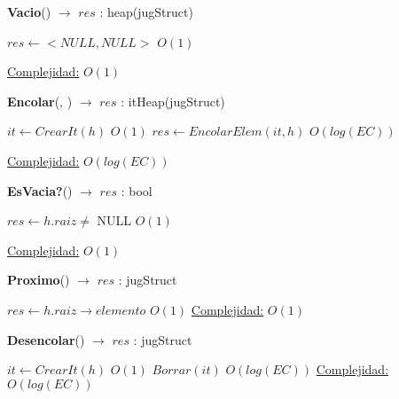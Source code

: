 \begin{Algoritmos}
   
\begin{algorithm}[H]{\textbf{Vacio}() $\to$ $res$ : heap(jugStruct)}
    	\begin{algorithmic}[1]
			 \State $res \gets  <NULL, NULL> $ \Comment $O(1)$

			\medskip
			\Statex \underline{Complejidad:} $O(1)$
    	\end{algorithmic}
\end{algorithm}
   
\begin{algorithm}[H]{\textbf{Encolar}(, ) $\to$ $res$ : itHeap(jugStruct)}
    	\begin{algorithmic}[1]
			 \State $it \gets  CrearIt(h) $ \Comment $O(1)$
			 \State $res \gets EncolarElem(it, h) $ \Comment $O(log(EC))$
			 

			\medskip
			\Statex \underline{Complejidad:} $O(log(EC))$
    	\end{algorithmic}
\end{algorithm}


\begin{algorithm}[H]{\textbf{EsVacia?}() $\to$ $res$ : bool}
    	\begin{algorithmic}[1]
			 \State $res \gets  h.raiz \not=$ NULL \Comment $O(1)$

			\medskip
			\Statex \underline{Complejidad:} $O(1)$
    	\end{algorithmic}
\end{algorithm}

\begin{algorithm}[H]{\textbf{Proximo}() $\to$ $res$ : jugStruct}
    	\begin{algorithmic}[1]
    		 \State $res \gets h.raiz \rightarrow elemento$ \Comment $O(1)$
    		 \medskip
			\Statex \underline{Complejidad:} $O(1)$
    	\end{algorithmic}
\end{algorithm}

\begin{algorithm}[H]{\textbf{Desencolar}() $\to$ $res$ : jugStruct}
    	\begin{algorithmic}[1]
    		 \State $it \gets CrearIt(h)$ \Comment $O(1)$
    		 \State $Borrar(it)$ \Comment $O(log(EC))$
    		 \medskip
			\Statex \underline{Complejidad:} $O(log(EC))$
    	\end{algorithmic}
\end{algorithm}

\end{Algoritmos}

\begin{Algoritmos}

\end{Algoritmos}